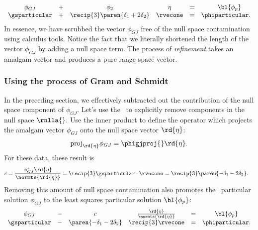 %
\begin{equation}
\begin{array}{ccccc c}
	\phi_{GJ} &+& \phi_{2} & \eta 
		&=& \phantom{wi} \bl{\phi_{p}} \\
	\gsparticular &+&  \recip{3} \paren{ \delta_{1}  + 2 \delta_{2}} &\rvecone 
		&=& \phiparticular .
\end{array}
\label{eq:ch-01:calculus}
\end{equation}
%
In essence, we have scrubbed the vector $\phi_{GJ}$ free of the null space contamination using calculus tools. Notice the fact that we literally shortened the length of the vector $\phi_{GJ}$ by adding a null space term. The process of \emph{refinement} takes an amalgam vector and produces a pure range space vector.
%
\subsubsection{Using the process of Gram and Schmidt} 
In the preceding section, we effectively subtracted out the contribution of the null space component of $\phi_{GJ}$. Let's use the \gs\ to explicitly remove components in the null space $\rnlla{}$. Use the inner product to define the operator which projects the amalgam vector $\phi_{GJ}$ onto the null space vector $\rd{\eta}$:
%
\begin{equation}
	\text{proj}_{\rd{\eta}} \phi_{GJ} = \phigjproj{} \rd{\eta}.
\label{eq:ch-01:projection operator}
\end{equation}
%
For these data, these result is
%
\begin{equation}
\begin{split}
	c = \frac{\phi_{GJ}^{*}\rd{\eta}} {\normts{\rd{\eta}}}
		& = \recip{3} \gsparticular \cdot \rvecone 
				= \recip{3} \paren{ -\delta_{1} - 2 \delta_{2} }.
\end{split}
\label{eq:ch-01:projection}
\end{equation}
%
Removing this amount of null space contamination also promotes the \gj \ particular solution $\phi_{GJ}$ to the least squares particular solution $\bl{\phi_{p}}$:
%
%
\begin{equation}
\begin{array}{ccccc c}
	\phi_{GJ} &-& c & \frac{\rd{\eta}} {\normts{\rd{\eta}}} 
		&=& \bl{\phi_{p}} \\
	\gsparticular &-& \paren{ -\delta_{1} - 2 \delta_{2} } & \recip{3}  \rvecone 
		&=& \phiparticular .
\end{array}
\label{eq:ch-01:gs removal}
\end{equation}

